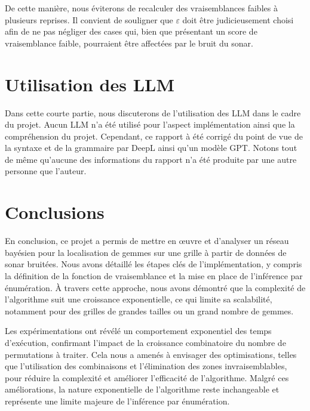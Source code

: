 \documentclass{article}
\begin{document}
\noindent De cette manière, nous éviterons de recalculer des vraisemblances faibles à plusieurs reprises. Il convient de souligner que \( \varepsilon \) doit être judicieusement choisi afin de ne pas négliger des cases qui, bien que présentant un score de vraisemblance faible, pourraient être affectées par le bruit du sonar. 

\section{Utilisation des LLM}

\noindent Dans cette courte partie, nous discuterons de l'utilisation des LLM dans le cadre du projet. Aucun LLM n'a été utilisé pour l'aspect implémentation ainsi que la compréhension du projet. Cependant, ce rapport à été corrigé du point de vue de la syntaxe et de la grammaire par DeepL ainsi qu'un modèle GPT. Notons tout de même qu'aucune des informations du rapport n'a été produite par une autre personne que l'auteur.

\section{Conclusions}

\noindent En conclusion, ce projet a permis de mettre en œuvre et d’analyser un réseau bayésien pour la localisation de gemmes sur une grille à partir de données de sonar bruitées. Nous avons détaillé les étapes clés de l’implémentation, y compris la définition de la fonction de vraisemblance et la mise en place de l’inférence par énumération. À travers cette approche, nous avons démontré que la complexité de l’algorithme suit une croissance exponentielle, ce qui limite sa scalabilité, notamment pour des grilles de grandes tailles ou un grand nombre de gemmes.

\vspace{1em}

\noindent Les expérimentations ont révélé un comportement exponentiel des temps d’exécution, confirmant l'impact de la croissance combinatoire du nombre de permutations à traiter. Cela nous a amenés à envisager des optimisations, telles que l’utilisation des combinaisons et l’élimination des zones invraisemblables, pour réduire la complexité et améliorer l’efficacité de l’algorithme. Malgré ces améliorations, la nature exponentielle de l’algorithme reste inchangeable et représente une limite majeure de l'inférence par énumération.
\end{document}

